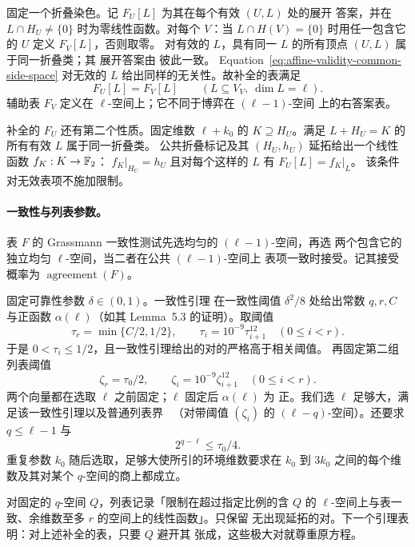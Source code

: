 固定一个折叠染色。记 $F_U[L]$ 为其在每个有效 $(U,L)$ 处的展开
答案，并在 $L\cap H_U\ne\{0\}$ 时为零线性函数。对每个 $V$：当
$L\cap H(V)=\{0\}$ 时用任一包含它的 $U$ 定义 $F_V[L]$，否则取零。
对有效的 $L$，具有同一 $L$ 的所有顶点 $(U,L)$ 属于同一折叠类；其
展开答案由 \cite[Claim~4.4]{DKKMS25} 彼此一致。
Equation~\eqref{eq:affine-validity-common-side-space} 对无效的 $L$
给出同样的无关性。故补全的表满足
\begin{equation}
  F_U[L]=F_V[L]\qquad(L\subseteq V_V,\ \dim L=\ell).
  \label{eq:affine-validity-completed-consistency}
\end{equation}
辅助表 $F_V$ 定义在 $\ell$-空间上；它不同于博弈在 $(\ell-1)$-空间
上的右答案表。

补全的 $F_U$ 还有第二个性质。固定维数 $\ell+k_0$ 的
$K\supseteq H_U$。满足 $L+H_U=K$ 的所有有效 $L$ 属于同一折叠类。
公共折叠标记及其 $(H_U,h_U)$ 延拓给出一个线性函数 $f_K:K\to\mathbb F_2$：
$f_K|_{H_U}=h_U$ 且对每个这样的 $L$ 有 $F_U[L]=f_K|_L$。
该条件对无效表项不施加限制。

\paragraph{一致性与列表参数。}
表 $F$ 的 Grassmann 一致性测试先选均匀的 $(\ell-1)$-空间，再选
两个包含它的独立均匀 $\ell$-空间，当二者在公共 $(\ell-1)$-空间上
表项一致时接受。记其接受概率为 $\operatorname{agreement}(F)$。

固定可靠性参数 $\delta\in(0,1)$。一致性引理
\cite[Lemma~3.7]{DKKMS25} 在一致性阈值 $\delta^2/8$ 处给出常数
$q,r,C$ 与正函数 $\alpha(\ell)$（如其 Lemma~5.3 的证明）。取阈值
\[
  \tau_r=\min\{C/2,1/2\},\qquad
  \tau_i=10^{-9}\tau_{i+1}^{12}\quad(0\le i<r).
\]
于是 $0<\tau_i\le1/2$，且一致性引理给出的对的严格高于相关阈值。
再固定第二组列表阈值
\[
 \zeta_r=\tau_0/2,\qquad
 \zeta_i=10^{-9}\zeta_{i+1}^{12}\quad(0\le i<r).
\]
两个向量都在选取 $\ell$ 之前固定；$\ell$ 固定后 $\alpha(\ell)$ 为
正。我们选 $\ell$ 足够大，满足该一致性引理以及普通列表界
~\cite[Lemma~3.12]{DKKMS25}（对带阈值 $(\zeta_i)$ 的
$(\ell-q)$-空间）。还要求 $q\le\ell-1$ 与
\begin{equation}
  2^{q-\ell}\le\tau_0/4.
  \label{eq:affine-validity-ell-margin}
\end{equation}
重复参数 $k_0$ 随后选取，足够大使所引的环境维数要求在 $k_0$ 到
$3k_0$ 之间的每个维数及其对某个 $q$-空间的商上都成立。

对固定的 $q$-空间 $Q$，列表记录「限制在超过指定比例的含 $Q$ 的
$\ell$-空间上与表一致、余维数至多 $r$ 的空间上的线性函数」。只保留
无出现延拓的对。下一个引理表明：对上述补全的表，只要 $Q$ 避开其
张成，这些极大对就尊重原方程。

